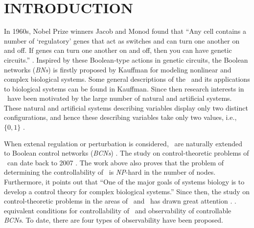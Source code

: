 \section{INTRODUCTION}

In 1960s, Nobel Prize winners Jacob and Monod found that  ``Any cell contains a number of `regulatory' genes that act as switches and can turn one another on and off. If genes can turn one another on and off, then you can have genetic circuits.'' \cite{Waldrop1992Complexity,cheng2009controllability}. Inspired by these Boolean-type actions in genetic circuits, the Boolean networks ({\em BNs}) is firstly proposed by Kauffman \cite{Kauffman1968Metabolic} for modeling nonlinear and complex biological systems. Some general descriptions of the \BNs\ and its applications to biological systems can be found in Kauffman. Since then research interests in  \BNs\ have been motivated by the large number of natural and artificial systems. These natural and artificial systems describing variables display only two distinct configurations, and hence these describing variables take only two values, i.e., $\{0,1\}$  \cite{Akutsu2000Inferring, Shmulevich2002From, Faur2006Dynamical,Green2007The,Lou2010Multi,Fornasini2013Observability}.


When extenal regulation or perturbation is considered, \BNs\ are naturally extended to Boolean control networks ({\em BCNs}) \cite{Ideker2001A}. The study on control-theoretic problems of \BCNs\ can date back to 2007 \cite{Akutsu2007Control}. The work above also proves that the problem of determining the controllability of \BCNs\ is {\em NP}-hard in the number of nodes. Furthermore, it points out that ``One of the major goals of systems biology is to develop a control theory for complex biological systems.'' Since then, the study on control-theoretic problems in the areas of \BNs\ and \BCNs\ has drawn great attention \cite{cheng2009controllability, Zhao2010Input, Cheng2011Identification, Cheng2011Analysis,Fornasini2013Observability}. .     equivalent conditions for controllability of \BCNs\ and observability of controllable {\em BCNs}. To date, there are four types of observability have been proposed. 

